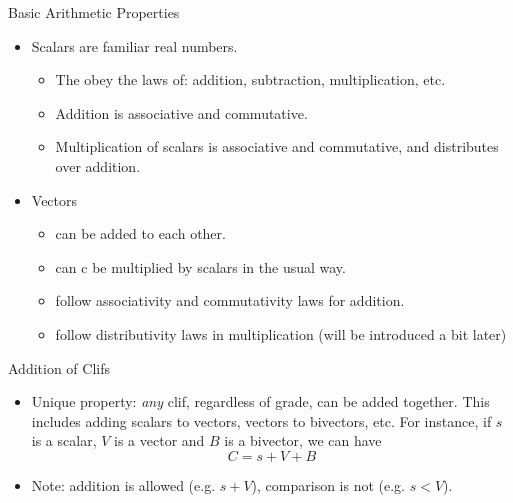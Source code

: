 \documentclass[aspectratio=169,xcolor=dvipsnames]{beamer}
\begin{document}
\begin{frame}{Basic Arithmetic Properties}
\begin{itemize}
\item Scalars are familiar real numbers. 
      \begin{itemize}
            \item The obey the laws of: addition, subtraction, multiplication, etc.
            \item Addition is associative and commutative.
            \item Multiplication of scalars is associative and commutative, and distributes over
                  addition.
      \end{itemize}
\item Vectors
      \begin{itemize}
            \item can be added to each other.
            \item can c be multiplied by scalars in the usual way.
            \item follow associativity and commutativity laws for addition.
            \item follow distributivity laws in multiplication (will be introduced a bit later)
      \end{itemize}
\end{itemize}

\end{frame}
      



\begin{frame}{Addition of Clifs}
\begin{itemize}
\item Unique property: \textit{any} clif, regardless of grade, can be added together.
      This includes adding scalars to vectors, vectors to bivectors, etc. For instance,
      if $s$ is a scalar, $V$ is a vector and $B$ is a bivector, we can have
      $$C = s + V + B$$
\item Note: addition is allowed (e.g. $s + V$), comparison is not (e.g. $s < V$).
\end{itemize}

\end{frame}
      
\end{document}
